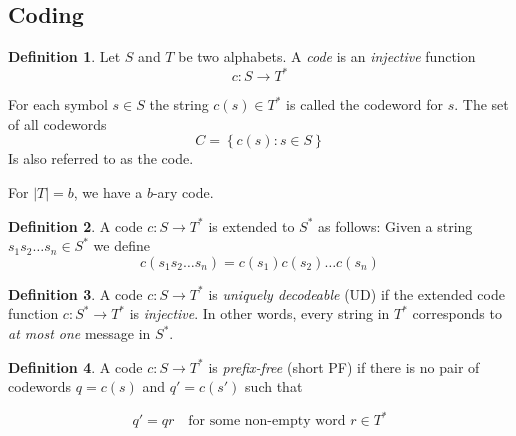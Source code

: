 \documentclass[a4paper]{article}
\theoremstyle{definition} \newtheorem*{definition}{Definition}
\begin{document}
\subsection{Coding}
\begin{definition}
  Let $S$ and $T$ be two alphabets. A \emph{code} is an \emph{injective}
  function 
  \[
    c : S \rightarrow T^*
  \]

  For each symbol $s \in S$ the string $c(s) \in T^*$ is called the 
  codeword for $s$. The set of all codewords
  \[
    C = \left\{ c(s) : s \in S \right\}
  \]
  Is also referred to as the code.
\end{definition}

\begin{remark}
  For $|T|=b$, we have a $b$-ary code.
\end{remark}

\begin{definition}
  A code $c : S \rightarrow T^*$ is extended to  $S^*$ as follows: Given
  a string $s_1s_2 \dots s_n \in S^*$ we define
  \[
    c(s_1s_2 \dots s_n) = c(s_1)c(s_2)\dots c(s_n)
  \]
\end{definition}

\begin{definition}
  A code $c : S \rightarrow T^*$ is \emph{uniquely decodeable} (UD) if the
  extended code function $c : S^{*} \rightarrow T^*$ is \emph{injective}.
  In other words, every string in $T^*$ corresponds to \emph{at most one} 
  message in $S^*$.
\end{definition}

\begin{definition}
  A code $c : S \rightarrow T^*$ is \emph{prefix-free} (short PF) if there
  is no pair of codewords $q = c(s)$ and $q' = c(s')$ such that

  \[
    q' = qr  \quad \text{for some non-empty word } r \in T^*
  \]
\end{definition}
\end{document}

